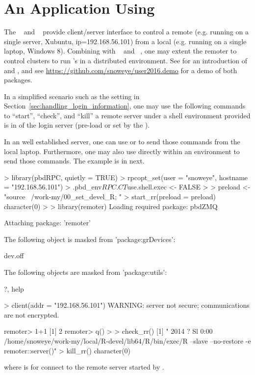 
\section[An Application Using \pkg{remoter}]{An Application Using }
\label{sec:application_rr}

The ~\citep{remoter} and ~\citep{Chen2015pbdZMQpackage}
provide client/server interface to control a remote 
(e.g. running on a single server, Xubuntu, ip=192.168.56.101)
from a local  (e.g. running on a single laptop, Windows 8).
Combining with ~\citep{Chen2012pbdMPIpackage} and
~\citep{pbdCS}, one may extent the
remoter  to control clusters to run
's in a distributed environment.
See \citet{xsede16} for an introduction of  and , and
see \url{https://github.com/snoweye/user2016.demo}
for a demo of both packages.

In a simplified scenario such as the setting in
Section~\ref{sec:handling_login_information}, one may use the following
commands to ``start'', ``check'', and ``kill'' a remote  server
under a shell environment provided  is in 
of the login server (pre-load or set by the ).

In an well established server, one can use  or 
to send those commands from the local laptop.
Furthermore, one may also use  directly within an 
environment to send those commands. The example is in next.
\begin{Code}[title=Using \pkg{pbdRPC} to control \pkg{remoter}]
> library(pbdRPC, quietly = TRUE)
> rpcopt_set(user = "snoweye", hostname = "192.168.56.101")
> .pbd_env$RPC.CT$use.shell.exec <- FALSE
>
> preload <- "source ~/work-my/00_set_devel_R; "
> start_rr(preload = preload)
character(0)
>
> library(remoter)
Loading required package: pbdZMQ

Attaching package: 'remoter'

The following object is masked from 'package:grDevices':

    dev.off

The following objects are masked from 'package:utils':

    ?, help

> client(addr = "192.168.56.101")
WARNING: server not secure; communications are not encrypted.

remoter> 1+1
[1] 2 
remoter> q()
>
> check_rr()
[1] " 2014 ?        Sl     0:00 /home/snoweye/work-my/local/R-devel/lib64/R/bin/exec/R --slave --no-restore -e remoter::server()"
> kill_rr()
character(0)
\end{Code}
where  is for connect to the remote  server
started by .

